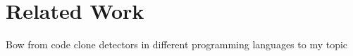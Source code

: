
\section{Related Work}
\label{sec:related_work}

Bow from code clone detectors in different programming languages to my topic